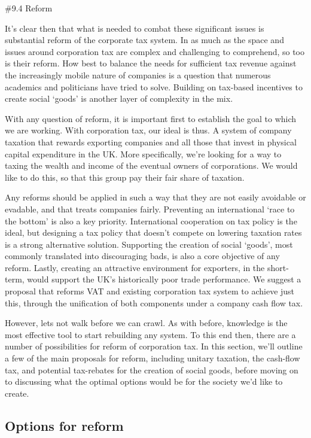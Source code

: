 \documentclass[]{tufte-handout}
\begin{document}
\#9.4 Reform

It's clear then that what is needed to combat these significant issues
is substantial reform of the corporate tax system. In as much as the
space and issues around corporation tax are complex and challenging to
comprehend, so too is their reform. How best to balance the needs for
sufficient tax revenue against the increasingly mobile nature of
companies is a question that numerous academics and politicians have
tried to solve. Building on tax-based incentives to create social
`goods' is another layer of complexity in the mix.

With any question of reform, it is important first to establish the goal
to which we are working. With corporation tax, our ideal is thus. A
system of company taxation that rewards exporting companies and all
those that invest in physical capital expenditure in the UK. More
specifically, we're looking for a way to taxing the wealth and income of
the eventual owners of corporations. We would like to do this, so that
this group pay their fair share of taxation.

Any reforms should be applied in such a way that they are not easily
avoidable or evadable, and that treats companies fairly. Preventing an
international `race to the bottom' is also a key priority. International
cooperation on tax policy is the ideal, but designing a tax policy that
doesn't compete on lowering taxation rates is a strong alternative
solution. Supporting the creation of social `goods', most commonly
translated into discouraging bads, is also a core objective of any
reform. Lastly, creating an attractive environment for exporters, in the
short-term, would support the UK's historically poor trade performance.
We suggest a proposal that reforms VAT and existing corporation tax
system to achieve just this, through the unification of both components
under a company cash flow tax.

However, lets not walk before we can crawl. As with before, knowledge is
the most effective tool to start rebuilding any system. To this end
then, there are a number of possibilities for reform of corporation tax.
In this section, we'll outline a few of the main proposals for reform,
including unitary taxation, the cash-flow tax, and potential tax-rebates
for the creation of social goods, before moving on to discussing what
the optimal options would be for the society we'd like to create.

\hypertarget{options-for-reform}{%
\subsection{Options for reform}\label{options-for-reform}}
\end{document}

